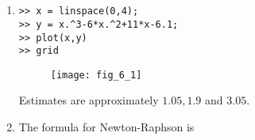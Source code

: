 \documentclass[../main.tex]{subfiles}
\begin{document}
\section{}
\begin{enumerate}[label=\bfseries(\alph*)]
\item
\begin{lstlisting}[numbers=none]
>> x = linspace(0,4);
>> y = x.^3-6*x.^2+11*x-6.1;
>> plot(x,y)
>> grid
\end{lstlisting}
\bigbreak
	\begin{figure}[H]
		\hspace*{1.25cm}\texttt{[image: fig\_6\_1]}
		\label{fig:fig_6_1}
	\end{figure}
	\bigbreak
Estimates are approximately $1.05,1.9$ and $3.05 .$
\bigbreak

\item The formula for Newton-Raphson is
\bigbreak



\end{enumerate}
\end{document}
